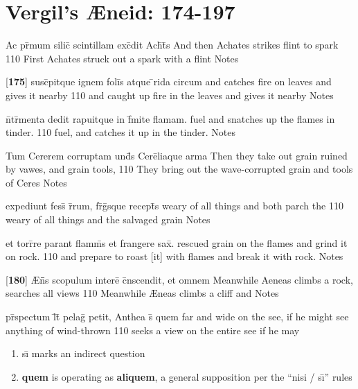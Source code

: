 \section{Vergil's {\AE}neid:  174-197} %

\latline
  {Ac pr\={\macron {\i}}mum silic\={\macron {\i}} scintillam exc\={}dit Ach\={}t\={}s}
  { And then Achates strikes flint to spark }
  {110}
  { First Achates struck out a spark with a flint }
  { Notes }



\latline
  {[\textbf{175}] susc\={}pitque ignem foli\={\macron {\i}}s atque \={}rida circum}
  { and catches fire on leaves and gives it nearby }
  {110}
  { and caught up fire in the leaves and gives it nearby }
  { Notes }


\latline
  {n\={}tr\={\macron {\i}}menta dedit rapuitque in f\={}mite flamam.}
  { fuel and snatches up the flames in tinder. }
  {110}
  { fuel, and catches it up in the tinder. }
  { Notes }


\latline
  {Tum Cererem corruptam und\={\macron {\i}}s Cere\={}liaque arma}
  { Then they take out grain ruined by vawes, and grain tools, }
  {110}
  { They bring out the wave-corrupted grain and tools of Ceres }
  { Notes }



\latline
  {expediunt fess\={\macron {\i}} r\={}rum, fr\={}g\={}sque recept\={}s}
  { weary of all things and both parch the  }
  {110}
  { weary of all things and the salvaged grain }
  { Notes }


\latline
  {et torr\={}re parant flamm\={\macron {\i}}s et frangere sax\={}.}
  { rescued grain on the flames and grind it on rock. }
  {110}
  { and prepare to roast [it] with flames and break it with rock. }
  { Notes }


\latline
  {[\textbf{180}] {\AE}n\={}\={}s scopulum intere\={} c\={}nscendit, et omnem}
  { Meanwhile Aeneas climbs a rock, searches all views }
  {110}
  { Meanwhile {\AE}neas climbs a cliff and  }
  { Notes }



\latline
  {pr\={}spectum l\={}t\={} pelag\={} petit, Anthea s\={\macron {\i}} quem}
  { far and wide on the see, if he might see anything of wind-thrown }
  {110}
  { seeks a view on the entire see if he may  }
  { \begin{enumerate}
  	\item s\={\i} marks an indirect question
  	\item \textbf{quem} is operating as \textbf{aliquem}, a general supposition per the ``nisi / s\={\i}'' rules
  \end{enumerate} }


